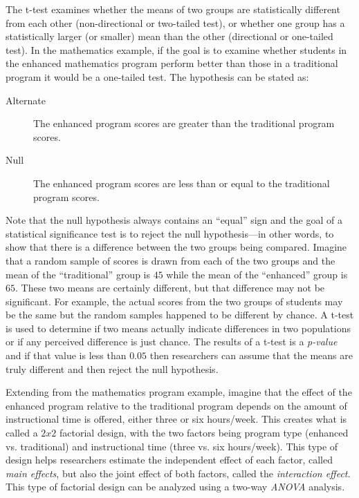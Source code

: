 The t-test examines whether the means of two groups are statistically different from each other (non-directional or two-tailed test), or whether one group has a statistically larger (or smaller) mean than the other (directional or one-tailed test). In the mathematics example, if the goal is to examine whether students in the enhanced mathematics program perform better than those in a traditional program it would be a one-tailed test. The hypothesis can be stated as:

\begin{description}
	\item[Alternate] The enhanced program scores are greater than the traditional program scores.
	\item[Null] The enhanced program scores are less than or equal to the traditional program scores.
\end{description}

Note that the null hypothesis always contains an ``equal'' sign and the goal of a statistical significance test is to reject the null hypothesis---in other words, to show that there is a difference between the two groups being compared. Imagine that a random sample of scores is drawn from each of the two groups and the mean of the ``traditional'' group is $ 45 $ while the mean of the ``enhanced'' group is $ 65 $. These two means are certainly different, but that difference may not be significant. For example, the actual scores from the two groups of students may be the same but the random samples happened to be different by chance. A t-test is used to determine if two means actually indicate differences in two populations or if any perceived difference is just chance. The results of a t-test is a \textit{p-value} and if that value is less than $ 0.05 $ then researchers can assume that the means are truly different and then reject the null hypothesis.

Extending from the mathematics program example, imagine that the effect of the enhanced program relative to the traditional program depends on the amount of instructional time is offered, either three or six hours/week. This creates what is called a $ 2 x 2 $ factorial design, with the two factors being program type (enhanced vs. traditional) and instructional time (three vs. six hours/week). This type of design helps researchers estimate the independent effect of each factor, called \textit{main effects}, but also the joint effect of both factors, called the \textit{interaction effect}. This type of factorial design can be analyzed using a two-way \textit{ANOVA} analysis. 

